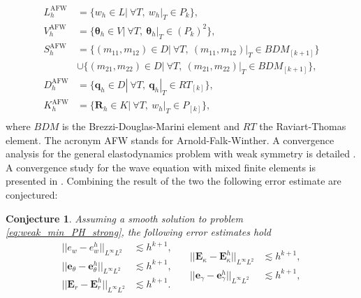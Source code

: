 \documentclass{ifacconf}
\newtheorem{conjecture}{Conjecture}
\begin{document}
\begin{equation}
\label{eq:AFW}
\begin{aligned}
L_h^{\text{AFW}} &= \{w_h \in L | \ \forall T, \ w_h|_{T} \in P_k \}, \\
V_h^{\text{AFW}} &= \{\bm{\theta}_h \in V | \ \forall T,\ \bm{\theta}_h|_{T} \in (P_k)^2 \}, \\
S_h^{\text{AFW}} &= \{(m_{11}, m_{12}) \in D| \ \forall T,\ (m_{11}, m_{12})|_{T} \in BDM_{[k+1]} \}  \\
& \cup \{(m_{21}, m_{22}) \in D| \ \forall T,\ (m_{21}, m_{22})|_{T} \in BDM_{[k+1]} \}, \\
D_h^{\text{AFW}} &= \{\bm{q}_h \in D | \ \forall T,\ \bm{q}_h|_{T} \in RT_{[k]} \}, \\
K_h^{\text{AFW}} &= \{\bm{R}_h \in K | \ \forall T, \ w_h|_{T} \in P_{[k]} \}, \\ 
\end{aligned}
\end{equation}
where $BDM$ is the Brezzi-Douglas-Marini element and $RT$ the Raviart-Thomas element. The acronym AFW stands for Arnold-Falk-Winther. A convergence analysis for the general elastodynamics problem with weak symmetry is detailed \cite{ArnoldWeak}. A convergence study for the wave equation with mixed finite elements is presented in \cite{Geveci}. Combining the result of the two the following error estimate are conjectured:
\begin{conjecture}
	Assuming a smooth solution to problem \eqref{eq:weak_min_PH_strong}, the following error estimates hold 
	\begin{equation}
	\label{eq:errAFW}
	\begin{aligned}
	||e_w - e_w^h||_{L^{\infty} L^2} &\lesssim h^{k+1}, \\
	||\bm{e}_\theta - \bm{e}_\theta^h||_{L^{\infty} L^2} &\lesssim h^{k+1}, \\
	||\bm{E}_r - \bm{E}_r^h||_{L^{\infty} L^2} &\lesssim h^{k+1}. \\
	\end{aligned} \quad
	\begin{aligned}
	||\bm{E}_\kappa - \bm{E}_\kappa^h||_{L^{\infty} L^2} &\lesssim  h^{k+1}, \\
	||\bm{e}_\gamma - \bm{e}_\gamma^ h||_{L^{\infty} L^2} &\lesssim  h^{k+1}, \\
	\end{aligned} 
	\end{equation}
\end{conjecture}
\end{document}
